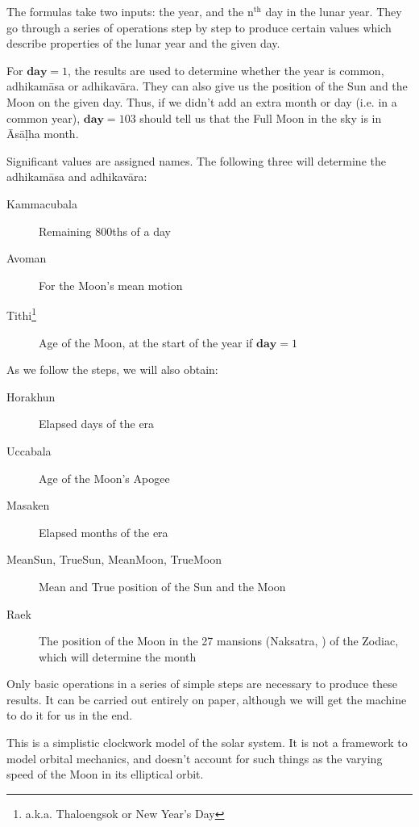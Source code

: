 \documentclass[11pt,oneside]{memoir-article}
\begin{document}
The formulas take two inputs: the year, and the n$^{\text{th}}$ day in the lunar year.
They go through a series of operations step by step to produce certain values
which describe properties of the lunar year and the given day.

For $\mathbf{day} = 1$, the results are used to determine whether the year is
common, adhikamāsa or adhikavāra. They can also give us the position of the Sun
and the Moon on the given day. Thus, if we didn't add an extra month or day
(i.e. in a common year), $\mathbf{day} = 103$ should tell us that the Full Moon
in the sky is in Āsāḷha month.

Significant values are assigned names.\cite{eade1989ephemeris} The following
three will determine the adhikamāsa and adhikavāra:

\savenotes

\begin{description}
\item[{Kammacubala }] Remaining 800ths of a day
\item[{Avoman }] For the Moon's mean motion
\item[{Tithi\footnote{a.k.a. Thaloengsok or New Year's Day} }] Age of the Moon, at the start of the year if $\mathbf{day} = 1$
\end{description}

As we follow the steps, we will also obtain:

\begin{description}
\item[{Horakhun }] Elapsed days of the era
\item[{Uccabala }] Age of the Moon's Apogee
\item[{Masaken }] Elapsed months of the era

\item[{MeanSun, TrueSun, MeanMoon, TrueMoon}] Mean and True position of the Sun and the Moon
\item[{Raek}] The position of the Moon in the 27 mansions (Naksatra, ) of the Zodiac, which will determine the month
\end{description}

\spewnotes

Only basic operations in a series of simple steps are necessary to produce these
results. It can be carried out entirely on paper, although we will get the
machine to do it for us in the end.

This is a simplistic clockwork model of the solar system. It is not a framework
to model orbital mechanics, and doesn't account for such things as the varying
speed of the Moon in its elliptical orbit.
\end{document}
